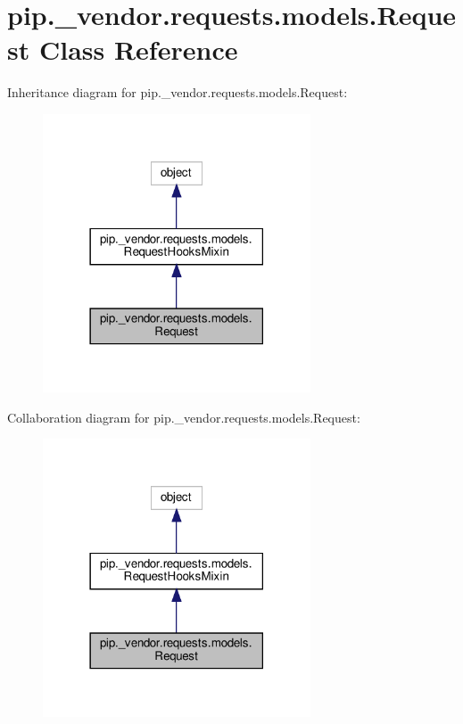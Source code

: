 \hypertarget{classpip_1_1__vendor_1_1requests_1_1models_1_1Request}{}\section{pip.\+\_\+vendor.\+requests.\+models.\+Request Class Reference}
\label{classpip_1_1__vendor_1_1requests_1_1models_1_1Request}


Inheritance diagram for pip.\+\_\+vendor.\+requests.\+models.\+Request\+:
\nopagebreak
\begin{figure}[H]
\begin{center}
\leavevmode
\includegraphics[width=225pt]{classpip_1_1__vendor_1_1requests_1_1models_1_1Request__inherit__graph}
\end{center}
\end{figure}


Collaboration diagram for pip.\+\_\+vendor.\+requests.\+models.\+Request\+:
\nopagebreak
\begin{figure}[H]
\begin{center}
\leavevmode
\includegraphics[width=225pt]{classpip_1_1__vendor_1_1requests_1_1models_1_1Request__coll__graph}
\end{center}
\end{figure}
